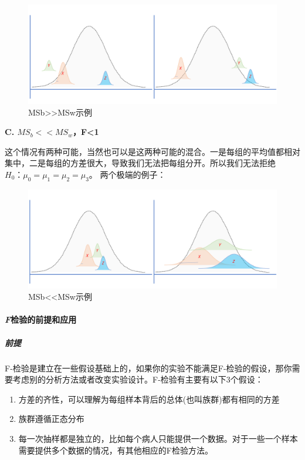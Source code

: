 \documentclass[
]{article}
\providecommand{\tightlist}{%
  \setlength{\itemsep}{0pt}\setlength{\parskip}{0pt}}
\begin{document}
\begin{figure}

{\centering \includegraphics[width=0.7\linewidth]{image/MSbgtMSw} 

}

\caption{MSb>>MSw示例}\label{fig:xyzanova3}
\end{figure}

\textbf{C. \(MS_b<<MS_w\)，F\textless1}

这个情况有两种可能，当然也可以是这两种可能的混合。一是每组的平均值都相对集中，二是每组的方差很大，导致我们无法把每组分开。所以我们无法拒绝\(H_0：μ_0=μ_1=μ_2=μ_3\)。
两个极端的例子：

\begin{figure}

{\centering \includegraphics[width=0.7\linewidth]{image/MSbltMSw} 

}

\caption{MSb<<MSw示例}\label{fig:xyzanova4}
\end{figure}

\hypertarget{fux68c0ux9a8cux7684ux524dux63d0ux548cux5e94ux7528}{%
\paragraph{\texorpdfstring{\emph{F}检验的前提和应用}{F检验的前提和应用}}\label{fux68c0ux9a8cux7684ux524dux63d0ux548cux5e94ux7528}}

\hypertarget{ux524dux63d0}{%
\subparagraph{前提}\label{ux524dux63d0}}

F-检验是建立在一些假设基础上的，如果你的实验不能满足F-检验的假设，那你需要考虑别的分析方法或者改变实验设计。F-检验有主要有以下3个假设：

\begin{enumerate}
\def\labelenumi{\arabic{enumi}.}
\tightlist
\item
  方差的齐性，可以理解为每组样本背后的总体(也叫族群)都有相同的方差
\item
  族群遵循正态分布
\item
  每一次抽样都是独立的，比如每个病人只能提供一个数据。对于一些一个样本需要提供多个数据的情况，有其他相应的F检验方法。
\end{enumerate}
\end{document}
